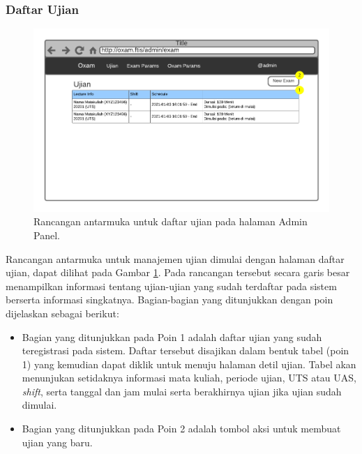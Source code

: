 \subsubsection{Daftar Ujian}
    \begin{figure}
        \centering
        \includegraphics{Gambar/mockups/Mockup--Admin - Exam Listing.pdf}
        \caption{Rancangan antarmuka untuk daftar ujian pada halaman Admin Panel.}
        \label{fig:mockup_admin_exam_listing}
    \end{figure}
    Rancangan antarmuka untuk manajemen ujian dimulai dengan halaman daftar ujian, dapat dilihat pada Gambar
    \ref{fig:mockup_admin_exam_listing}. Pada rancangan tersebut secara garis besar menampilkan informasi tentang
    ujian-ujian yang sudah terdaftar pada sistem berserta informasi singkatnya. Bagian-bagian yang ditunjukkan
    dengan poin dijelaskan sebagai berikut:
    \begin{itemize}
        \item Bagian yang ditunjukkan pada Poin 1 adalah daftar ujian yang sudah teregistrasi pada sistem.
            Daftar tersebut disajikan dalam bentuk tabel (poin 1) yang kemudian dapat diklik untuk menuju halaman detil ujian.
            Tabel akan menunjukan setidaknya informasi mata kuliah, periode ujian, UTS atau UAS, \textit{shift},
            serta tanggal dan jam mulai serta berakhirnya ujian jika ujian sudah dimulai.
        
        \item Bagian yang ditunjukkan pada Poin 2 adalah tombol aksi untuk membuat ujian yang baru.
    \end{itemize}
    
